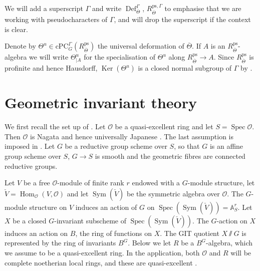 \documentclass{amsart}
\theoremstyle{definition}
\theoremstyle{remark}
\DeclareMathOperator{\Hom}{Hom}
\DeclareMathOperator{\Sym}{Sym}
\DeclareMathOperator{\Ker}{Ker}
\DeclareMathOperator{\Spec}{Spec}
\DeclareMathOperator{\Def}{Def}
\newcommand{\OO}{\mathcal O}
\newcommand{\cPC}{\mathrm{cPC}}
\newcommand{\Thetabar}{\overline{\Theta}}
\newcommand{\ps}{\mathrm{ps}}
\begin{document}
We will add a superscript $\Gamma$ and write $\Def^{\Gamma}_{\Thetabar}$, $R^{\ps, \Gamma}_{\Thetabar}$ to emphasise that  we are working with pseudocharacters of $\Gamma$, and will drop the superscript if the context is clear. 

Denote by $\Theta^u \in \cPC^{\Gamma}_G(R^{\ps}_{\Thetabar})$ the universal deformation of $\Thetabar$. If 
$A$ is an $R^{\ps}_{\Thetabar}$-algebra we will write $\Theta^u_{|A}$ for 
the specialisation of $\Theta^u$ along $R^{\ps}_{\Thetabar} \rightarrow A$. Since $R^{\ps}_{\Thetabar}$ is profinite and hence Hausdorff, $\Ker(\Theta^u)$ is a closed normal subgroup of $\Gamma$ by .


\section{Geometric invariant theory}\label{sec_GIT}

We first recall the set up of \cite{seshadri}. Let $\OO$ be a quasi-excellent ring and let $S=\Spec \OO$. Then $\OO$ is Nagata \cite[\href{https://stacks.math.columbia.edu/tag/07QV}{Tag 07QV}]{stacks-project}
and hence universally Japanese \cite[\href{https://stacks.math.columbia.edu/tag/0334}{Tag 0334}]{stacks-project}. The last assumption is imposed in  \cite{seshadri}. 
Let $G$ be a reductive group scheme over $S$, so that $G$ is an affine group scheme over $S$, $G\rightarrow S$ is smooth and the geometric fibres are connected reductive groups. 
 
Let $V$ be a free $\OO$-module of finite rank $r$ endowed with a $G$-module structure, let $\check{V}=\Hom_{\OO}(V, \OO)$ and let $\Sym(\check{V})$ be the symmetric algebra over $\OO$. The $G$-module structure on $V$ induces an action of $G$ on $\Spec(\Sym(\check{V})) = \mathbb A^r_S.$ Let $X$ be a closed $G$-invariant subscheme of $\Spec (\Sym(\check{V}))$. The $G$-action on $X$ induces an action on $B$, the ring of functions on $X$. The GIT quotient $X\sslash G$ is represented by the ring of invariants $B^G$.
Below we let $R$ be a $B^G$-algebra, which we assume to be a quasi-excellent ring. In the application, both $\OO$ and $R$ will be complete noetherian local rings, and these
are quasi-excellent \cite[\href{https://stacks.math.columbia.edu/tag/07QW}{Tag 07QW}]{stacks-project}.
\end{document}
